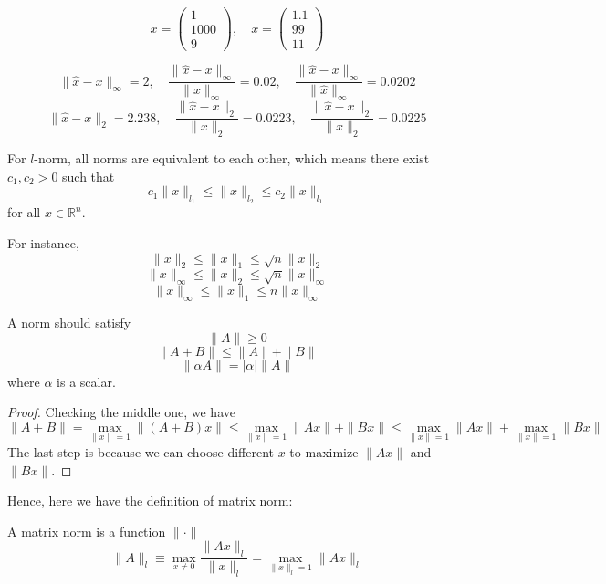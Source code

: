 \begin{eg}
    \[
        x = \begin{pmatrix}
            1 \\ 1000 \\ 9
        \end{pmatrix}, \quad 
        x = \begin{pmatrix}
            1.1 \\ 99 \\ 11
        \end{pmatrix}
    \]
\end{eg}

\[
    \|\hat{x} - x\|_\infty = 2, \quad \frac{\|\hat{x} - x\|_\infty}{\|x\|_\infty} = 0.02, \quad \frac{\|\hat{x} - x\|_\infty}{\|\hat{x}\|_\infty} = 0.0202
\]
\[
    \|\hat{x} - x\|_2 = 2.238, \quad \frac{\|\hat{x} - x\|_2}{\|x\|_2} = 0.0223, \quad \frac{\|\hat{x} - x\|_2}{\|\hat{x}\|_2} = 0.0225
\]

\begin{corollary}
    For $l$-norm, all norms are equivalent to each other, which means there exist $c_1, c_2 > 0$ such that \[
        c_1 \|x\|_{l_1} \leq \|x\|_{l_2} \leq c_2 \|x\|_{l_1}
    \]
    for all $x \in \mathbb{R}^n$.
\end{corollary}

For instance, \[
    \|x\|_2 \leq \|x\|_1 \leq \sqrt{n} \|x\|_2 \tag{2.3.1}
\]
\[
    \|x\|_\infty \leq \|x\|_2 \leq \sqrt{n} \|x\|_\infty \tag{2.3.2}
\]
\[
    \|x\|_\infty \leq \|x\|_1 \leq n \|x\|_\infty \tag{2.3.3}
\]

\begin{theorem}[norm]
    A norm should satisfy \[
        \|A\| \geq 0
    \]\[
        \|A + B\| \leq \|A\| + \|B\| \tag{2.3.4}
    \]\[
        \|\alpha A\| = |\alpha| \|A\|
    \]
    where $\alpha$ is a scalar.
\end{theorem}
\begin{proof}
    Checking the middle one, we have \[
        \|A+B\| = \max_{\|x\| = 1} \|(A+B)x\| \leq \max_{\|x\| = 1} \|Ax\| + \|Bx\| \leq \max_{\|x\| = 1} \|Ax\| + \max_{\|x\| = 1} \|Bx\|
    \]
    The last step is because we can choose different $x$ to maximize $\|Ax\|$ and $\|Bx\|$.
\end{proof}

Hence, here we have the definition of matrix norm:

\begin{definition}
    A matrix norm is a function $\|\cdot\|$ \[
        \|A\|_l \equiv \max_{x \neq 0} \frac{\|Ax\|_l}{\|x\|_l} = \max_{\|x\|_l = 1} \|Ax\|_l
    \]
\end{definition}

